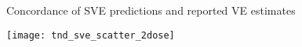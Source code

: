 \documentclass{beamer}
\begin{document}









\begin{frame}[c]{Concordance of SVE predictions and reported VE estimates}

\hspace*{-0.5cm}\texttt{[image: tnd\_sve\_scatter\_2dose]}

\note{
}

\end{frame}

\end{document}
